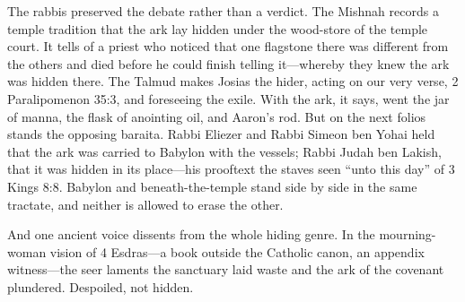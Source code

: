 The rabbis preserved the debate rather than a verdict. The Mishnah records
a temple tradition that the ark lay hidden under the wood-store of the
temple court. It tells of a priest who noticed that one flagstone there
was different from the others and died before he could finish telling
it---whereby they knew the ark was hidden there. The Talmud makes Josias
the hider, acting on our very verse, 2 Paralipomenon 35:3, and foreseeing
the exile. With the ark, it says, went the jar of manna, the flask of
anointing oil, and Aaron's rod. But on the next folios stands the opposing
baraita. Rabbi Eliezer and Rabbi Simeon ben Yohai held that the ark was
carried to Babylon with the vessels; Rabbi Judah ben Lakish, that it was
hidden in its place---his prooftext the staves seen ``unto this day'' of
3 Kings 8:8. Babylon and beneath-the-temple stand side by side in the same
tractate, and neither is allowed to erase the other.

And one ancient voice dissents from the whole hiding genre. In the
mourning-woman vision of 4 Esdras---a book outside the Catholic canon, an
appendix witness---the seer laments the sanctuary laid waste and the ark
of the covenant plundered. Despoiled, not hidden.

